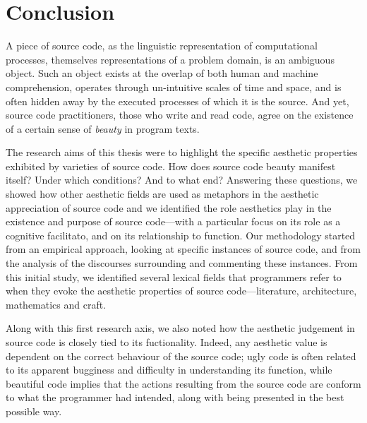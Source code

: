 \chapter{Conclusion}
\label{chap:conclusion}

%
%



A piece of source code, as the linguistic representation of computational processes, themselves representations of a problem domain, is an ambiguous object. Such an object exists at the overlap of both human and machine comprehension, operates through un-intuitive scales of time and space, and is often hidden away by the executed processes of which it is the source. And yet, source code practitioners, those who write and read code, agree on the existence of a certain sense of \emph{beauty} in program texts.

The research aims of this thesis were to highlight the specific aesthetic properties exhibited by varieties of source code. How does source code beauty manifest itself? Under which conditions? And to what end? Answering these questions, we showed how other aesthetic fields are used as metaphors in the aesthetic appreciation of source code and we identified the role aesthetics play in the existence and purpose of source code—with a particular focus on its role as a cognitive facilitato, and on its relationship to function. Our methodology started from an empirical approach, looking at specific instances of source code, and from the analysis of the discourses surrounding and commenting these instances. From this initial study, we identified several lexical fields that programmers refer to when they evoke the aesthetic properties of source code—literature, architecture, mathematics and craft.

Along with this first research axis, we also noted how the aesthetic judgement in source code is closely tied to its fuctionality. Indeed, any aesthetic value is dependent on the correct behaviour of the source code; ugly code is often related to its apparent bugginess and difficulty in understanding its function, while beautiful code implies that the actions resulting from the source code are conform to what the programmer had intended, along with being presented in the best possible way.

